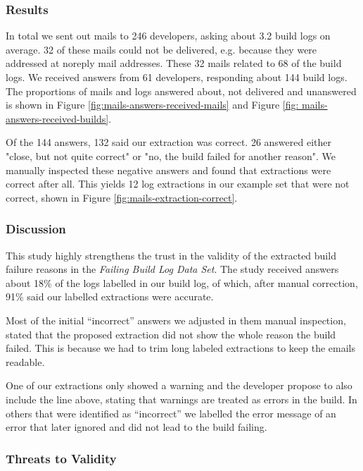 \documentclass[\myrootdir/main.tex]{subfiles}
\begin{document}
\subsubsection{Results}
In total we sent out mails to 246 developers, asking about 3.2 build logs on average.
32 of these mails could not be delivered, e.g. because they were addressed at noreply mail addresses.
These 32 mails related to 68 of the build logs.
We received answers from 61 developers, responding about 144 build logs.
The proportions of mails and logs answered about, not delivered and unanswered is shown in Figure \ref{fig:mails-answers-received-mails} and Figure \ref{fig: mails-answers-received-builds}.

Of the 144 answers, 132 said our extraction was correct.
26 answered either "close, but not quite correct" or "no, the build failed for another reason".
We manually inspected these negative answers and found that extractions were correct after all.
This yields 12 log extractions in our example set that were not correct, shown in Figure \ref{fig:mails-extraction-correct}.

\subsubsection{Discussion}
This study highly strengthens the trust in the validity of the extracted build failure reasons in the \emph{Failing Build Log Data Set}.
The study received answers about 18\% of the logs labelled in our build log, of which, after manual correction, 91\% said our labelled extractions were accurate.

Most of the initial ``incorrect'' answers we adjusted in them manual inspection, stated that the proposed extraction did not show the whole reason the build failed.
This is because we had to trim long labeled extractions to keep the emails readable.

One of our extractions only showed a warning and the developer propose to also include the line above, stating that warnings are treated as errors in the build.
In others that were identified as ``incorrect'' we labelled the error message of an error that later ignored and did not lead to the build failing.

\subsubsection{Threats to Validity}
\end{document}
